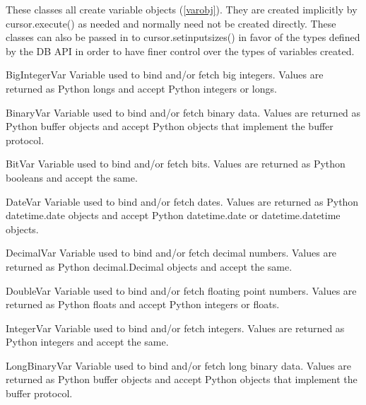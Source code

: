 \documentclass{manual}
\begin{document}
These classes all create variable objects (\ref{varobj}). They are created
implicitly by cursor.execute() as needed and normally need not be created
directly. These classes can also be passed in to cursor.setinputsizes() in
favor of the types defined by the DB API in order to have finer control over
the types of variables created.

\begin{datadesc}{BigIntegerVar}
  Variable used to bind and/or fetch big integers. Values are returned as
  Python longs and accept Python integers or longs.
\end{datadesc}

\begin{datadesc}{BinaryVar}
  Variable used to bind and/or fetch binary data. Values are returned as Python
  buffer objects and accept Python objects that implement the buffer protocol.
\end{datadesc}

\begin{datadesc}{BitVar}
  Variable used to bind and/or fetch bits. Values are returned as Python
  booleans and accept the same.
\end{datadesc}

\begin{datadesc}{DateVar}
  Variable used to bind and/or fetch dates. Values are returned as Python
  datetime.date objects and accept Python datetime.date or datetime.datetime
  objects.
\end{datadesc}

\begin{datadesc}{DecimalVar}
  Variable used to bind and/or fetch decimal numbers. Values are returned as
  Python decimal.Decimal objects and accept the same.
\end{datadesc}

\begin{datadesc}{DoubleVar}
  Variable used to bind and/or fetch floating point numbers. Values are
  returned as Python floats and accept Python integers or floats.
\end{datadesc}

\begin{datadesc}{IntegerVar}
  Variable used to bind and/or fetch integers. Values are returned as Python
  integers and accept the same.
\end{datadesc}

\begin{datadesc}{LongBinaryVar}
  Variable used to bind and/or fetch long binary data. Values are returned as
  Python buffer objects and accept Python objects that implement the buffer
  protocol.
\end{datadesc}
\end{document}
